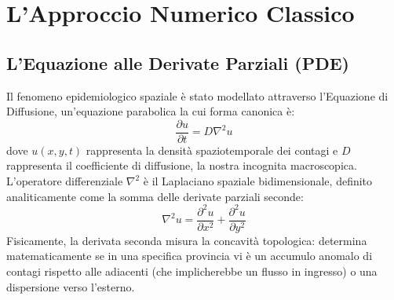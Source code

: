 \documentclass[12pt,a4paper]{article}
\begin{document}
\section{L'Approccio Numerico Classico}

\subsection{L'Equazione alle Derivate Parziali (PDE)}
Il fenomeno epidemiologico spaziale è stato modellato attraverso l'Equazione di Diffusione, un'equazione parabolica la cui forma canonica è:
\begin{equation}
    \frac{\partial u}{\partial t} = D \nabla^2 u
\end{equation}
dove $u(x,y,t)$ rappresenta la densità spaziotemporale dei contagi e $D$ rappresenta il coefficiente di diffusione, la nostra incognita macroscopica. L'operatore differenziale $\nabla^2$ è il Laplaciano spaziale bidimensionale, definito analiticamente come la somma delle derivate parziali seconde:
\begin{equation}
    \nabla^2 u = \frac{\partial^2 u}{\partial x^2} + \frac{\partial^2 u}{\partial y^2}
\end{equation}
Fisicamente, la derivata seconda misura la concavità topologica: determina matematicamente se in una specifica provincia vi è un accumulo anomalo di contagi rispetto alle adiacenti (che implicherebbe un flusso in ingresso) o una dispersione verso l'esterno.
\end{document}
